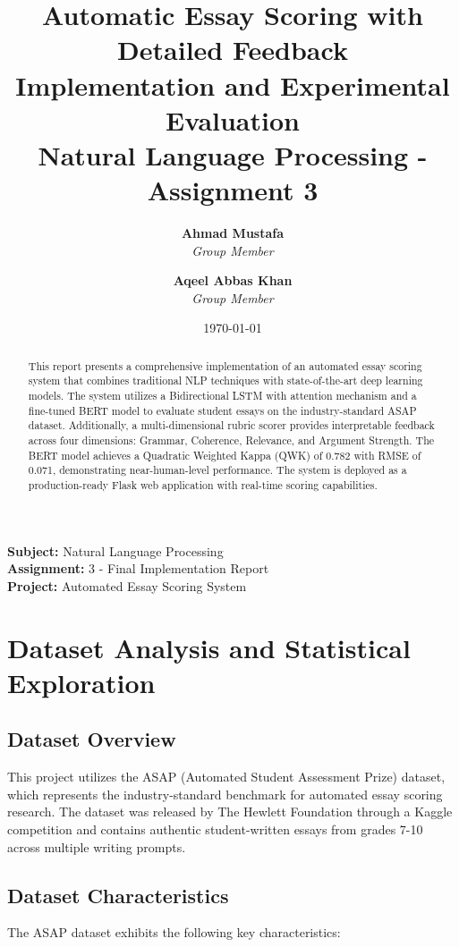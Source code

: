 ﻿\documentclass[12pt,a4paper]{article}
\title{\textbf{Automatic Essay Scoring with Detailed Feedback}\\
\large Implementation and Experimental Evaluation\\
\vspace{0.5cm}
\large Natural Language Processing - Assignment 3}
\author{
    \textbf{Ahmad Mustafa}\\
    \textit{Group Member}\\
    \and
    \textbf{Aqeel Abbas Khan}\\
    \textit{Group Member}
}
\date{\today}
\begin{document}
\maketitle
\thispagestyle{empty}

\begin{center}
\vspace{1cm}
\large
\textbf{Subject:} Natural Language Processing\\
\textbf{Assignment:} 3 - Final Implementation Report\\
\textbf{Project:} Automated Essay Scoring System\\
\end{center}

\vfill

\begin{abstract}
This report presents a comprehensive implementation of an automated essay scoring system that combines traditional NLP techniques with state-of-the-art deep learning models. The system utilizes a Bidirectional LSTM with attention mechanism and a fine-tuned BERT model to evaluate student essays on the industry-standard ASAP dataset. Additionally, a multi-dimensional rubric scorer provides interpretable feedback across four dimensions: Grammar, Coherence, Relevance, and Argument Strength. The BERT model achieves a Quadratic Weighted Kappa (QWK) of 0.782 with RMSE of 0.071, demonstrating near-human-level performance. The system is deployed as a production-ready Flask web application with real-time scoring capabilities.
\end{abstract}

\newpage
\tableofcontents
\newpage

\section{Dataset Analysis and Statistical Exploration}

\subsection{Dataset Overview}
This project utilizes the ASAP (Automated Student Assessment Prize) dataset, which represents the industry-standard benchmark for automated essay scoring research. The dataset was released by The Hewlett Foundation through a Kaggle competition and contains authentic student-written essays from grades 7-10 across multiple writing prompts.

\subsection{Dataset Characteristics}
The ASAP dataset exhibits the following key characteristics:
\end{document}
